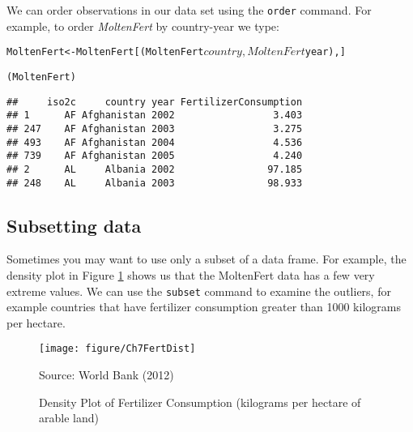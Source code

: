 We can order observations in our data set using the \texttt{order} command. For example, to order \emph{MoltenFert} by country-year we type:

\begin{knitrout}
\color{fgcolor}\begin{kframe}
\begin{alltt}
MoltenFert <- MoltenFert[(MoltenFert$country,
                                MoltenFert$year), ]

(MoltenFert)
\end{alltt}
\begin{verbatim}
##     iso2c     country year FertilizerConsumption
## 1      AF Afghanistan 2002                 3.403
## 247    AF Afghanistan 2003                 3.275
## 493    AF Afghanistan 2004                 4.536
## 739    AF Afghanistan 2005                 4.240
## 2      AL     Albania 2002                97.185
## 248    AL     Albania 2003                98.933
\end{verbatim}
\end{kframe}
\end{knitrout}


\subsection{Subsetting data}

Sometimes you may want to use only a subset of a data frame. For example, the density plot in Figure \ref{FertilizerConsumptionDens} shows us that the MoltenFert data has a few very extreme values. We can use the \texttt{subset} command to examine the outliers, for example countries that have fertilizer consumption greater than 1000 kilograms per hectare.  

\begin{figure}
    \caption{Density Plot of Fertilizer Consumption (kilograms per hectare of arable land)}
    \label{FertilizerConsumptionDens}
\begin{knitrout}
\color{fgcolor}

{\centering \texttt{[image: figure/Ch7FertDist]} 

}



\end{knitrout}

    {\scriptsize{Source: World Bank (2012)}}
\end{figure} 

